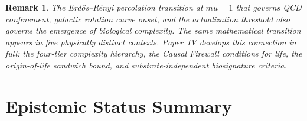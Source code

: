 \documentclass[11pt]{article}
\def\mu{mu}%
\newtheorem{remark}{Remark}
\begin{document}
\begin{remark}
The Erd\H{o}s--R\'enyi percolation transition at $\mu=1$ that governs QCD confinement, galactic rotation curve onset, and the actualization threshold also governs the emergence of biological complexity. The same mathematical transition appears in five physically distinct contexts. Paper~IV develops this connection in full: the four-tier complexity hierarchy, the Causal Firewall conditions for life, the origin-of-life sandwich bound, and substrate-independent biosignature criteria.
\end{remark}

\section{Epistemic Status Summary}
\label{sec:status}
\end{document}
